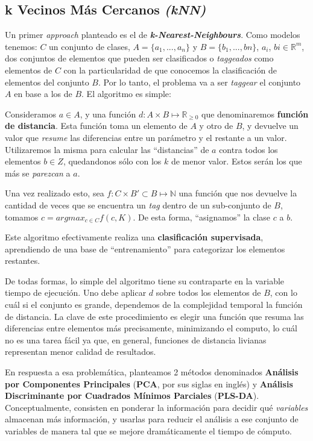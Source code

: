 \subsection{k Vecinos M\'as Cercanos \textit{(kNN)}}\label{intro_knn}

Un primer \textit{approach} planteado es el de \textit{\textbf{k-Nearest-Neighbours}}. Como modelos tenemos: $C$ un conjunto de clases, $A = \{a_{1}, ..., a_{n}\}$ y $B = \{b_{1}, ..., b{n}\}$, $a_{i}$, $b{i} \in \mathbb{R}^m$, dos conjuntos de elementos que pueden ser clasificados o \textit{taggeados} como elementos de $C$ con la particularidad de que conocemos la clasificaci\'on de elementos del conjunto $B$. Por lo tanto, el problema va a ser \textit{taggear} el conjunto $A$ en base a los de $B$. El algoritmo es simple:

Consideramos $a \in A$, y una funci\'on $d : A \times B \mapsto \mathbb{R}_{\geq 0}$ que denominaremos \textbf{funci\'on de distancia}. Esta funci\'on toma un elemento de $A$ y otro de $B$, y devuelve un valor que \textit{resume} las diferencias entre un par\'ametro y el restante a un valor. Utilizaremos la misma para calcular las ``distancias'' de $a$ contra todos los elementos $b \in Z$, quedandonos s\'olo con los $k$ de menor valor. Estos ser\'an los que m\'as se \textit{parezcan} a $a$.

Una vez realizado esto, sea $f : C \times B' \subset B \mapsto \mathbb{N}$ una funci\'on que nos devuelve la cantidad de veces que se encuentra un \textit{tag} dentro de un sub-conjunto de $B$, tomamos $c = argmax_{c \in C} f(c, K)$. De esta forma, ``asignamos'' la clase $c$ a $b$.

Este algoritmo efectivamente realiza una \textbf{clasificaci\'on supervisada}, aprendiendo de una base de ``entrenamiento'' para categorizar los elementos restantes.

De todas formas, lo simple del algoritmo tiene su contraparte en la variable tiempo de ejecuci\'on. Uno debe aplicar $d$ sobre todos los elementos de $B$, con lo cu\'al si el conjunto es grande, dependemos de la complejidad temporal la funci\'on de distancia. La clave de este procedimiento es elegir una funci\'on que resuma las diferencias entre elementos m\'as precisamente, minimizando el computo, lo cu\'al no es una tarea f\'acil ya que, en general, funciones de distancia livianas representan menor calidad de resultados.

En respuesta a esa problem\'atica, planteamos 2 m\'etodos denominados \textbf{An\'alisis por Componentes Principales} (\textbf{PCA}, por sus siglas en ingl\'es) y \textbf{An\'alisis Discriminante por Cuadrados M\'inimos Parciales} (\textbf{PLS-DA}). Conceptualmente, consisten en ponderar la informaci\'on para decidir qu\'e \textit{variables} almacenan m\'as informaci\'on, y usarlas para reducir el an\'alisis a ese conjunto de variables de manera tal que se mejore dram\'aticamente el tiempo de c\'omputo.

